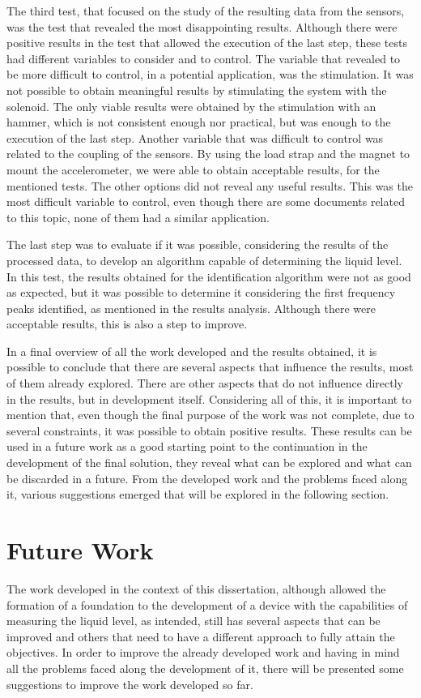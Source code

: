 The third test, that focused on the study of the resulting data from the sensors, was the test that revealed the most disappointing results. Although there were positive results in the test that allowed the execution of the last step, these tests had different variables to consider and to control. The variable that revealed to be more difficult to control, in a potential application, was the stimulation. It was not possible to obtain meaningful results by stimulating the system with the solenoid. The only viable results were obtained by the stimulation with an hammer, which is not consistent enough nor practical, but was enough to the execution of the last step. Another variable that was difficult to control was related to the coupling of the sensors. By using the load strap and the magnet to mount the accelerometer, we were able to obtain acceptable results, for the mentioned tests. The other options did not reveal any useful results. This was the most difficult variable to control, even though there are some documents related to this topic, none of them had a similar application. 

The last step was to evaluate if it was possible, considering the results of the processed data, to develop an algorithm capable of determining the liquid level. In this test, the results obtained for the identification algorithm were not as good as expected, but it was possible to determine it considering the first frequency peaks identified, as mentioned in the results analysis. Although there were acceptable results, this is also a step to improve.

In a final overview of all the work developed and the results obtained, it is possible to conclude that there are several aspects that influence the results, most of them already explored. There are other aspects that do not influence directly in the results, but in development itself. Considering all of this, it is important to mention that, even though the final purpose of the work was not complete, due to several constraints, it was possible to obtain positive results. These results can be used in a future work as a good starting point to the continuation in the development of the final solution, they reveal what can be explored and what can be discarded in a future. From the developed work and the problems faced along it, various suggestions emerged that will be explored in the following section. 
\section{Future Work}\label{sec:FutureWork}
The work developed in the context of this dissertation, although allowed the formation of a foundation to the development of a device with the capabilities of measuring the liquid level, as intended, still has several aspects that can be improved and others that need to have a different approach to fully attain the objectives. In order to improve the already developed work and having in mind all the problems faced along the development of it, there will be presented some suggestions to improve the work developed so far. 

